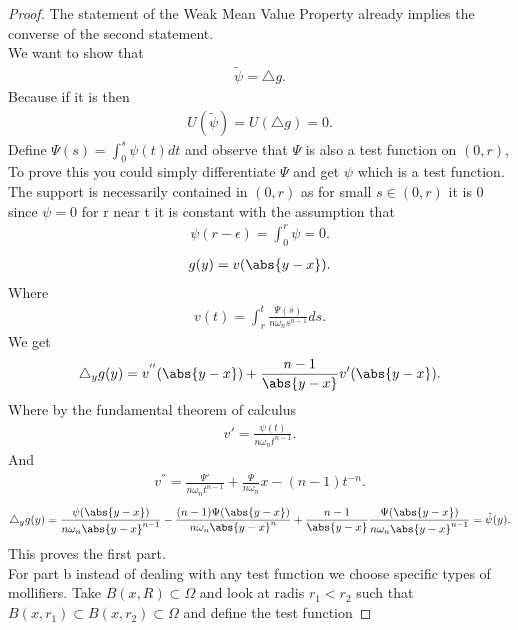 \begin{proof}
  The statement of the Weak Mean Value Property already implies the converse of the second statement. \\[1ex] 
  We want to show that 
  \begin{align*}
    \tilde{\psi} = \triangle g
  .\end{align*}
  Because if it is then 
  \begin{align*}
    U(\tilde{\psi}) = U(\triangle g) = 0
  .\end{align*}
  Define $\Psi(s) = \int_0^{s} \psi(t) dt  $ and observe that $\Psi$ is also a test function on $(0,r)$,
  To prove this you could simply differentiate $\Psi$ and get $\psi$ which is a test function. 
  The support is necessarily contained in $(0,r)$ as for small $s \in  (0,r)$ it is 0 since $\psi =0$ for 
  r near t it is constant with the assumption that 
  \begin{align*}
    \psi(r-\epsilon) = \int_0^{r} \psi = 0 
  .\end{align*}
  \begin{align*}
    g(y) = v(\abs{y-x}) 
  .\end{align*}
  Where 
  \begin{align*}
    v(t) = \int_r^{t} \frac{\Psi(s)}{n \omega_n s^{n-1} }  ds
  .\end{align*}
  We get 
  \begin{align*}
    \triangle_y g(y) = v^{''}(\abs{y-x}) + \frac{n-1}{\abs{y-x}}v'(\abs{y-x})
  .\end{align*}
  Where  by the fundamental theorem of calculus
  \begin{align*}
    v'  = \frac{\psi(t)}{n \omega_n t^{n-1}}
  .\end{align*}
  And 
  \begin{align*}
    v^{''} = \frac{\Psi'}{n \omega_n t^{n-1}} + \frac{\Psi}{n \omega_n}x - (n-1)t^{-n}
  .\end{align*}
  \begin{align*}
    \triangle_y g(y) = \frac{\psi(\abs{y-x})}{n \omega_n \abs{y-x}^{n-1} } - \frac{(n-1)\Psi(\abs{y-x})}{n \omega_n \abs{y-x}^{n} } + \frac{n-1}{\abs{y-x}} \frac{\Psi(\abs{y-x})}{n \omega_n \abs{y-x}^{n-1} } = \tilde{\psi}(y)
  .\end{align*}
  This proves the first part. \\[1ex]
  For part b instead of dealing with any test function we choose specific types of mollifiers.
  Take $B(x,R) \subset  \Omega $   and look at radis $r_{1} <r_{2} $ such that $B(x,r_{1}) \subset  B(x,r_{2}) \subset  \Omega $ and define the test function 

\end{proof}
